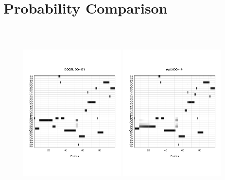 \documentclass[12pt,t]{beamer}
\begin{document}
\section{Probability Comparison}
	\begin{frame}
		\begin{figure}
			\vspace{-0.1in}
			{\includegraphics[height=3.7in, width=2.1in]{figures/uni_probs_heat_171_doqtl_size.pdf}} 
			{\includegraphics[height=3.7in, width=2.1in]{figures/uni_probs_heat_171_rqtl2_size.pdf}}
		\end{figure}		
	\end{frame}
	
\end{document}
